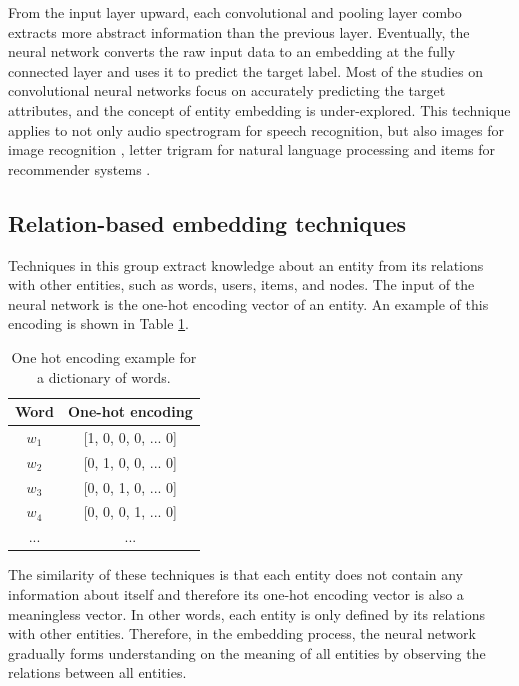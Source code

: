 \documentclass[conference]{IEEEtran}
\begin{document}
From the input layer upward,
each convolutional and pooling layer combo extracts more abstract information
than the previous layer.
Eventually, the neural network converts the raw input data to an embedding
at the fully connected layer and uses it to predict the target label.
Most of the studies on convolutional neural networks focus on accurately
predicting the target attributes,
and the concept of entity embedding is under-explored.
This technique applies to not only audio spectrogram for speech recognition, but also images for image recognition \cite{krizhevsky2012imagenet},
letter trigram for natural language processing \cite{collobert2008unified}
and items for recommender systems \cite{elkahky2015multi}.

\subsection{Relation-based embedding techniques}
Techniques in this group extract knowledge about an entity from its relations 
with other entities, such as words, users, items, and nodes.
The input of the neural network is the one-hot encoding vector of an entity.
An example of this encoding is shown in Table \ref{tab:one-hot}.
\begin{table}[!ht]
	\centering
	\caption{One hot encoding example for a dictionary of words.}
	\begin{tabular}{cc} \hline \rowcolor{blue!30}
		Word & One-hot encoding \\ \hline
		$ w_1 $ & [1, 0, 0, 0, ... 0]       \\ \hline
		$ w_2 $ & [0, 1, 0, 0, ... 0]       \\ \hline
		$ w_3 $ & [0, 0, 1, 0, ... 0]       \\ \hline
		$ w_4 $ & [0, 0, 0, 1, ... 0]       \\ \hline
		... & ...       \\ \hline
	\end{tabular}
	\label{tab:one-hot}
\end{table}
The similarity of these techniques is that each entity does not contain any
information about itself and therefore its one-hot encoding vector is also
a meaningless vector.
In other words, each entity is only defined by its relations with other entities.
Therefore, in the embedding process, the neural network gradually
forms understanding on the meaning of all entities by observing the relations
between all entities.
\end{document}
